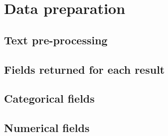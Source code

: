 \section{Data preparation}

\subsection{Text pre-processing}

\subsection{Fields returned for each result}

\subsection{Categorical fields}

\subsection{Numerical fields}
